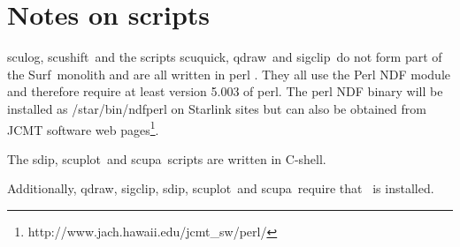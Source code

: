 \documentclass[twoside,11pt]{article}
\newcommand{\scusoft}          {{\sc Surf}}
\newcommand{\Kappa}{\xref{{\sc{Kappa}}}{sun95}{}}
\newcommand{\task}[1]{{\sf #1}}
\newcommand{\scuquick}{\htmlref{\task{scuquick}}{SCUQUICK}}
\newcommand{\sculog}{\htmlref{\task{sculog}}{SCULOG}}
\newcommand{\qdraw}{\htmlref{\task{qdraw}}{QDRAW}}
\newcommand{\sigclip}{\htmlref{\task{sigclip}}{SIGCLIP}}
\newcommand{\sdip}{\htmlref{\task{sdip}}{SDIP}}
\newcommand{\scupa}{\htmlref{\task{scupa}}{SCUPA}}
\newcommand{\scushift}{\htmlref{\task{scushift}}{SCUSHIFT}}
\newcommand{\scuplot}{\htmlref{\task{scuplot}}{SCUPLOT}}
\newcommand{\htmladdnormallinkfoot}[2]{#1\footnote{#2}}
\newcommand{\htmlref}[2]{#1}
\newcommand{\xref}[3]{#1}
\newcommand{\xlabel}[1]{}
\begin{document}
\section{\xlabel{ndfperl}Notes on scripts\label{ndfperl}}

\sculog, \scushift\ and the scripts \scuquick, \qdraw\ and \sigclip\ do not form part of
the \scusoft\ monolith and are all written in perl \cite{Perl}. They all use
the Perl NDF module and therefore require at least version 5.003 of perl. The
perl NDF binary will be installed as /star/bin/ndfperl on Starlink sites but
can also be obtained from
\htmladdnormallinkfoot{JCMT software web pages}{http://www.jach.hawaii.edu/jcmt\_sw/perl/}.

The \sdip, \scuplot\ and \scupa\ scripts are written in C-shell.

Additionally, \qdraw, \sigclip, \sdip, \scuplot\ and \scupa\ require that
\Kappa\ is installed.
\end{document}
